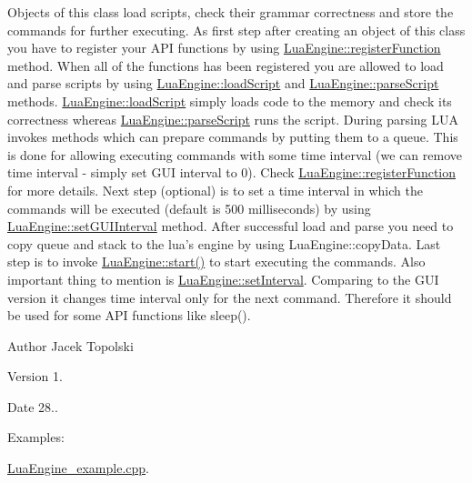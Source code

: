 Objects of this class load scripts, check their grammar correctness and store the commands for further executing. As first step after creating an object of this class you have to register your A\-P\-I functions by using \hyperlink{class_lua_engine_a03530362918aceccd6f69a5cecf2a968}{Lua\-Engine\-::register\-Function} method. When all of the functions has been registered you are allowed to load and parse scripts by using \hyperlink{class_lua_engine_aab9337ae5ea59bccc1e08c4015d42700}{Lua\-Engine\-::load\-Script} and \hyperlink{class_lua_engine_a5eae05f78704166f098ea20568c23fd7}{Lua\-Engine\-::parse\-Script} methods. \hyperlink{class_lua_engine_aab9337ae5ea59bccc1e08c4015d42700}{Lua\-Engine\-::load\-Script} simply loads code to the memory and check its correctness whereas \hyperlink{class_lua_engine_a5eae05f78704166f098ea20568c23fd7}{Lua\-Engine\-::parse\-Script} runs the script. During parsing L\-U\-A invokes methods which can prepare commands by putting them to a queue. This is done for allowing executing commands with some time interval (we can remove time interval -\/ simply set G\-U\-I interval to 0). Check \hyperlink{class_lua_engine_a03530362918aceccd6f69a5cecf2a968}{Lua\-Engine\-::register\-Function} for more details. Next step (optional) is to set a time interval in which the commands will be executed (default is 500 milliseconds) by using \hyperlink{class_lua_engine_ac29f2b09b45797aac68bd5caa6fe2c90}{Lua\-Engine\-::set\-G\-U\-I\-Interval} method. After successful load and parse you need to copy queue and stack to the lua's engine by using Lua\-Engine\-::copy\-Data. Last step is to invoke \hyperlink{class_lua_engine_a28e0795b54170d763a929256566fe2b5}{Lua\-Engine\-::start()} to start executing the commands. Also important thing to mention is \hyperlink{class_lua_engine_a0b87a8b474070665af6e435a2c5bce56}{Lua\-Engine\-::set\-Interval}. Comparing to the G\-U\-I version it changes time interval only for the next command. Therefore it should be used for some A\-P\-I functions like sleep(). \begin{DoxyAuthor}{Author}
Jacek Topolski 
\end{DoxyAuthor}
\begin{DoxyVersion}{Version}
1. 
\end{DoxyVersion}
\begin{DoxyDate}{Date}
28.. 
\end{DoxyDate}
\begin{Desc}
\item[Examples\-: ]\par
\hyperlink{_lua_engine_example_8cpp-example}{Lua\-Engine\-\_\-example.\-cpp}.\end{Desc}


